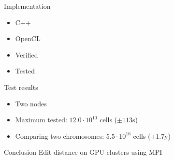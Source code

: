 \begin{frame}
    
\end{frame}
\begin{frame}
    
\end{frame}
\begin{frame}
    
\end{frame}
\begin{frame}
    
\end{frame}
\begin{frame}
    
\end{frame}

\begin{frame}{Implementation}
    \begin{itemize}
        \item C++
        \item OpenCL
        \item Verified
        \item Tested
    \end{itemize}
\end{frame}


\begin{frame}{Test results}
    \begin{itemize}
        \item Two nodes
        \item Maximum tested: $12.0\cdot10^{10}$ cells ($\pm 113$s)
        \item Comparing two chromosomes: $5.5\cdot10^{16}$ cells ($\pm 1.7$y)
    \end{itemize}
\end{frame}



\begin{frame}
    
\end{frame}
\begin{frame}
    
\end{frame}
\begin{frame}
    
\end{frame}
\begin{frame}
    
\end{frame}
\begin{frame}{Conclusion}
Edit distance on GPU clusters using MPI
\end{frame}

